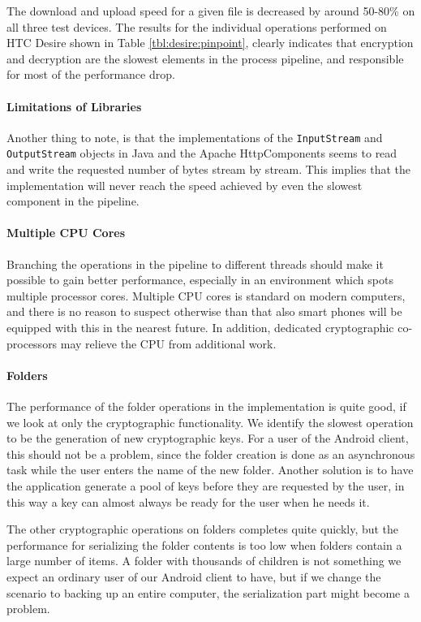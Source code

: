 \documentclass[pdftex,english,10pt,b5paper,twoside]{book}
\begin{document}
The download and upload speed for a given file is decreased by around
50-80\% on all three test devices. The results for the individual operations
performed on HTC Desire shown in Table \ref{tbl:desire:pinpoint}, clearly
indicates that encryption and decryption are the slowest elements in the
process pipeline, and responsible for most of the performance drop. 

\paragraph{Limitations of Libraries} Another thing to note, is that the
implementations of the \texttt{InputStream} and \texttt{OutputStream}
objects in Java and the Apache HttpComponents seems to read and write the
requested number of bytes stream by stream. This implies that the
implementation will never reach the speed achieved by even the slowest
component in the pipeline.

\paragraph{Multiple CPU Cores} Branching the operations in the pipeline to
different threads should make it possible to gain better performance,
especially in an environment which spots multiple processor cores. Multiple
\ac{CPU} cores is standard on modern computers, and there is no reason to
suspect otherwise than that also smart phones will be equipped with this in the
nearest future. In addition, dedicated cryptographic co-processors may
relieve the \ac{CPU} from additional work.

\paragraph{Folders} The performance of the folder operations in the
implementation is quite good, if we look at only the cryptographic
functionality. We identify the slowest operation to be the generation of
new cryptographic keys. For a user of the Android client, this should not be a
problem, since the folder creation is done as an asynchronous task while the
user enters the name of the new folder. Another solution is to have the
application generate a pool of keys before they are requested by the user, in
this way a key can almost always be ready for the user when he needs it.

The other cryptographic operations on folders completes quite quickly, but the
performance for serializing the folder contents is too low when folders contain
a large number of items. A folder with thousands of children is not
something we expect an ordinary user of our Android client to have, but if we
change the scenario to backing up an entire computer, the serialization part
might become a problem. 
\end{document}
